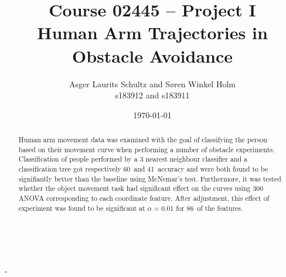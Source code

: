\documentclass[11pt,fleqn]{article}
\title{Course 02445 -- Project I\\Human Arm Trajectories in Obstacle Avoidance}
\author{Asger Laurits Schultz and Søren Winkel Holm\\s183912 and s183911}
\date{\today}
\begin{document}
\maketitle
\thispagestyle{empty}
\renewcommand{\abstractname}{Summary}

\begin{figure}[H]
	\centering
	\\
\end{figure}

\newpage
\setcounter{page}{1}-
\begin{abstract}\noindent 
Human arm movement data was examined with the goal of classifying the person based on their movement curve when performing a number of obstacle experiments.
Classification of people performed by a 3 nearest neighbour classifier and a classification tree got respectively 60\pro\ and 41\pro\ accuracy and were both found to be signifiantly better than the baseline using McNemar's test.  
Furthermore, it was tested whether the object movement task had significant effect on the  curves using 300 ANOVA corresponding to each coordinate feature. 
After adjustment, this effect of experiment was found to be significant at \(\alpha=0.01\) for 86\pro\ of the features.
\end{abstract}
\end{document}
